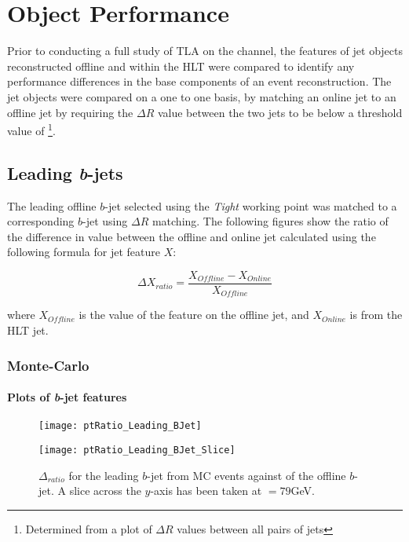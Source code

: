 \chapter{Object Performance}\label{c:OP}

Prior to conducting a full study of TLA on the \VBFHBB channel, the features of jet objects reconstructed offline and within the HLT were compared to identify any performance differences in the base components of an event reconstruction. The jet objects were compared on a one to one basis, by matching an online jet to an offline jet by requiring the $\Delta R$ value between the two jets to be below a threshold value of \DELTARTHRESHOLD\footnote{Determined from a plot of $\Delta R$ values between all pairs of jets}. 

\section{Leading \textit{b}-jets}
\label{OP:leadingb}

	The leading \pt offline $b$-jet selected using the \textit{Tight} working point was matched to a corresponding $b$-jet using $\Delta R$ matching. The following figures show the ratio of the difference in value between the offline and online jet calculated using the following formula for jet feature $X$:

	\begin{equation}
	\Delta X_{ratio} = \frac{X_{Offline} - X_{Online}}{X_{Offline}}
	\end{equation}

	where $X_{Offline}$ is the value of the feature on the offline jet, and $X_{Online}$ is from the HLT jet.

	\newpage
	\subsection{Monte-Carlo}

		\subsubsection{Plots of \textit{b}-jet features}

		\begin{figure}[h]
			\centering
			\begin{minipage}[h]{0.33\linewidth}
				\texttt{[image: ptRatio\_Leading\_BJet]}

			\end{minipage}
			\quad
			\begin{minipage}[h]{0.33\linewidth}
				\texttt{[image: ptRatio\_Leading\_BJet\_Slice]}
			\end{minipage}
			\caption{$\Delta $\pt$_{ratio}$ for the leading \pt $b$-jet from MC events against \pt of the offline $b$-jet. A slice across the $y$-axis has been taken at \pt$=79$GeV. }
			\label{fig:MC:leadingbpt}
		\end{figure}

